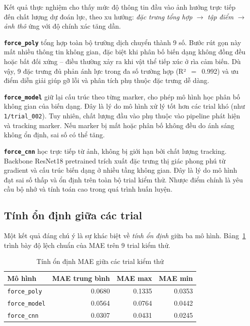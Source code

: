 Kết quả thực nghiệm cho thấy mức độ thông tin đầu vào ảnh hưởng trực tiếp
đến chất lượng dự đoán lực, theo xu hướng: \emph{đặc trưng tổng hợp $\to$
tập điểm $\to$ ảnh thô} ứng với độ chính xác tăng dần.

\textbf{\texttt{force\_poly}} tổng hợp toàn bộ trường dịch chuyển thành 9
số. Bước rút gọn này mất nhiều thông tin không gian, đặc biệt khi phân bố
biến dạng không đồng đều hoặc bất đối xứng -- điều thường xảy ra khi vật thể
tiếp xúc ở rìa cảm biến. Dù vậy, 9 đặc trưng đủ phản ánh lực trong đa số
trường hợp (R²~$=$~0.992) và ưu điểm diễn giải giúp gỡ lỗi và phân tích
phụ thuộc đặc trưng dễ dàng.

\textbf{\texttt{force\_model}} giữ lại cấu trúc theo từng marker, cho phép
mô hình học phân bố không gian của biến dạng. Đây là lý do mô hình xử lý tốt
hơn các trial khó (như \texttt{1/trial\_002}). Tuy nhiên, chất lượng đầu vào
phụ thuộc vào pipeline phát hiện và tracking marker. Nếu marker bị mất hoặc
phân bố không đều do ánh sáng không ổn định, sai số có thể tăng.

\textbf{\texttt{force\_cnn}} học trực tiếp từ ảnh, không bị giới hạn bởi
chất lượng tracking. Backbone ResNet18 pretrained trích xuất đặc trưng thị
giác phong phú từ gradient và cấu trúc biến dạng ở nhiều tầng không gian.
Đây là lý do mô hình đạt sai số thấp và ổn định trên toàn bộ trial kiểm
thử. Nhược điểm chính là yêu cầu bộ nhớ và tính toán cao trong quá trình
huấn luyện.

\subsection{Tính ổn định giữa các trial}

Một kết quả đáng chú ý là sự khác biệt về \emph{tính ổn định} giữa ba mô
hình. Bảng~\ref{tab:stability} trình bày độ lệch chuẩn của MAE trên 9 trial
kiểm thử.

\begin{table}[h]
\centering
\caption{Tính ổn định MAE giữa các trial kiểm thử}
\label{tab:stability}
\begin{tabular}{lrrr}
\toprule
\textbf{Mô hình} & \textbf{MAE trung bình} & \textbf{MAE max} & \textbf{MAE min} \\
\midrule
\texttt{force\_poly}  & 0.0680 & 0.1335 & 0.0353 \\
\texttt{force\_model} & 0.0564 & 0.0764 & 0.0442 \\
\texttt{force\_cnn}   & 0.0307 & 0.0431 & 0.0245 \\
\bottomrule
\end{tabular}
\end{table}


